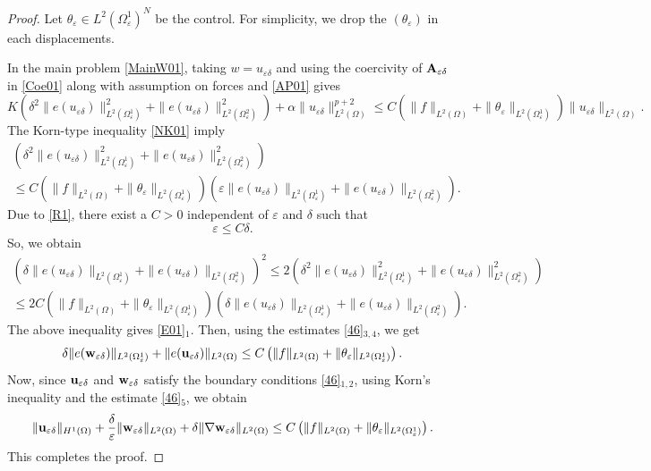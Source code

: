 \documentclass[11pt,a4paper]{article}
\numberwithin{equation}{section}
\def\wo{\overline}
\def\O{\Omega}
\def\d{\delta}
\def\e{\varepsilon}
\def\a{{\alpha}}
\def\ed{{\varepsilon\delta}}
\def\Gu{{\bf u}}
\def\Gw{{\bf w}}
\def\GA{{\bf A}}
\begin{document}
		\begin{proof}
			Let $\theta_\e\in L^2(\O^1_\e)^N$ be the control. For simplicity, we drop the $(\theta_\e)$ in each displacements.
			
		In the main problem \eqref{MainW01}, taking $w= u_\ed$ and using the coercivity of $\GA_\ed$ in \eqref{Coe01} along with assumption on forces and \eqref{AP01} gives
		$$K\left(\d^2\|e(u_\ed)\|^2_{L^2(\O^1_\e)}+\|e(u_\ed)\|^2_{L^2(\O^2_\e)}\right)+\a\|u_\ed\|^{p+2}_{L^2(\O)}\leq C\left(\|f\|_{L^2(\O)}+\|\theta_\e\|_{L^2(\O^1_\e)}\right)\|u_\ed\|_{L^2(\O)}.$$
		The Korn-type inequality \eqref{NK01}
		imply
		\begin{multline*}
			\left(\d^2\|e(u_\ed)\|^2_{L^2(\O^1_\e)}+\|e(u_\ed)\|^2_{L^2(\O^2_\e)}\right)\\
			\leq C\left(\|f\|_{L^2(\O)}+\|\theta_\e\|_{L^2(\O^1_\e)}\right)\left(\e\|e(u_\ed)\|_{L^2(\O^1_\e)}+\|e(u_\ed)\|_{L^2(\O^2_\e)}\right).
		\end{multline*}
		Due to \eqref{R1}, there exist a $C>0$ independent of $\e$ and $\d$ such that
		\begin{equation}\label{R11}
			\e\leq C\d.
		\end{equation}
	 So, we obtain
		\begin{multline*}
			\left(\d\|e(u_\ed)\|_{L^2(\O^1_\e)}+\|e(u_\ed)\|_{L^2(\O^2_\e)}\right)^2
			\leq 2\left(\d^2\|e(u_\ed)\|^2_{L^2(\O^1_\e)}+\|e(u_\ed)\|^2_{L^2(\O^2_\e)}\right)\\
			\leq 2C\left(\|f\|_{L^2(\O)}+\|\theta_\e\|_{L^2(\O^1_\e)}\right)\left(\d\|e(u_\ed)\|_{L^2(\O^1_\e)}+\|e(u_\ed)\|_{L^2(\O^2_\e)}\right).
		\end{multline*}
		The above inequality gives \eqref{E01}$_1$. Then, using the estimates \eqref{46}$_{3,4}$, we get
		$$\begin{aligned}
			 \d \|e(\Gw_\ed)\|_{L^2(\O^1_\e)} +\|e(\Gu_\ed)\|_{L^2(\O)}\leq C\left(\|f\|_{L^2(\O)}+\|\theta_\e\|_{L^2(\O^1_\e)}\right).
		\end{aligned}$$
		Now, since $\Gu_\ed$ and $\Gw_\ed$ satisfy the boundary conditions \eqref{46}$_{1,2}$, using Korn's inequality and the estimate \eqref{46}$_5$, we obtain
		$$\|\Gu_\ed\|_{H^1(\O)}+{\d \over \e}\|\Gw_\ed\|_{L^2(\O)}+\d\|\nabla \Gw_\ed\|_{L^2(\O)}\leq C\left(\|f\|_{L^2(\O)}+\|\theta_\e\|_{L^2(\O^1_\e)}\right).$$
		This completes the proof.
		\end{proof}
\end{document}
